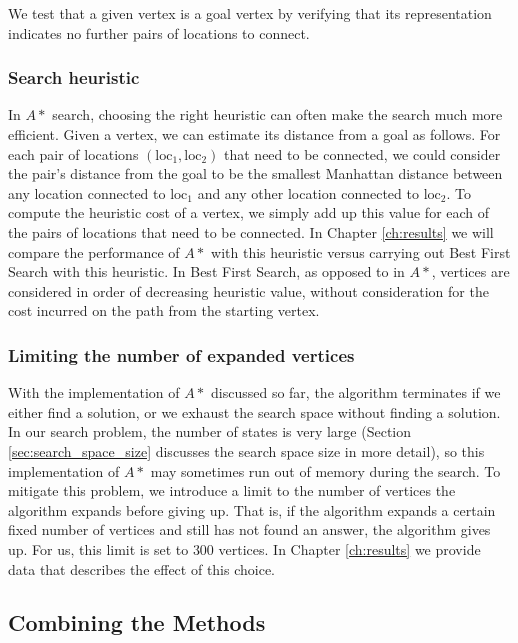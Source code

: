 We test that a given vertex is a goal vertex by verifying that its
representation indicates no further pairs of locations to connect.

\subsubsection{Search heuristic}

In $A*$ search, choosing the right heuristic can often make the search much more
efficient. Given a
vertex, we can estimate its distance from a goal as follows. For each pair of
locations $(\text{loc}_1, \text{loc}_2)$ that need to be connected, we could consider the
pair's distance from the
goal to be the smallest Manhattan distance between any location connected to
$\text{loc}_1$ and any other location connected to $\text{loc}_2$. To compute the heuristic
cost of a vertex, we simply add up this value for each of the pairs of locations
that need to be connected. In Chapter \ref{ch:results} we will compare the
performance of $A*$ with this heuristic versus carrying out Best First Search
with this heuristic. In Best First Search, as opposed to in $A*$, vertices are
considered in order of decreasing heuristic value, without consideration for
the cost incurred on the path from the starting vertex.

\subsubsection{Limiting the number of expanded vertices}

With the implementation of $A*$ discussed so far, the algorithm
terminates if we either find a solution, or we
exhaust the search space without finding a solution. In our search problem, the
number of states is very large (Section \ref{sec:search_space_size} discusses
the search space size
in more detail), so this implementation of $A*$ may sometimes run out
of memory during the search. To mitigate this problem, we introduce a limit to
the number of vertices the algorithm expands before giving up. That is, if the
algorithm expands a certain fixed number of vertices and still has not found an
answer, the algorithm gives up. For us, this limit is set to $300$ vertices.
In Chapter \ref{ch:results} we provide data that describes the effect of this
choice.

\subsection{Combining the Methods}
\label{sec:combined_alg}


